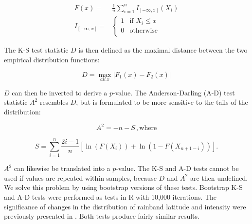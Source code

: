 \documentclass[singlecolumn,11pt]{pnas-new}
\begin{document}
\begin{align}
	F(x) =& \frac{1}{n}\sum_{i=1}^n I_{[-\infty,x]} (X_i) \\
	I_{[-\infty,x]} =& 
	\begin{cases}
   		 1 & \text{if } X_i \leq x\\
    		0 & \text{otherwise} \\
    	\end{cases}
\end{align}

 The K-S test statistic $D$ is then defined as the maximal distance between the two empirical distribution functions:

\begin{equation}
	D=\max_{all\ x} |F_{1}(x)-F_{2}(x)|
\end{equation}

$D$ can then be inverted to derive a $p$-value. The Anderson-Darling (A-D) test statistic $A^2$ resembles $D$, but is formulated to be more sensitive to the tails of the distribution:

\begin{equation}
	A^2 = -n-S \,,
	\mathrm{where}
\end{equation}

\begin{equation}
	S=\sum_{i=1}^n \frac{2i-1}{n}\left[\ln(F(X_i)) + \ln\left(1-F(X_{n+1-i})\right)\right].
\end{equation}

	$A^2$ can likewise be translated into a $p$-value. The K-S and A-D tests cannot be used if values are repeated within samples, because $D$ and $A^2$ are then undefined. We solve this problem by using bootstrap versions of these tests. Bootstrap K-S and A-D tests were performed as tests in R with 10,000 iterations. The significance of changes in the distribution of rainband latitude and intensity were previously presented in \citet{Day2016}. Both tests produce fairly similar results.
	
\clearpage

\end{document}
